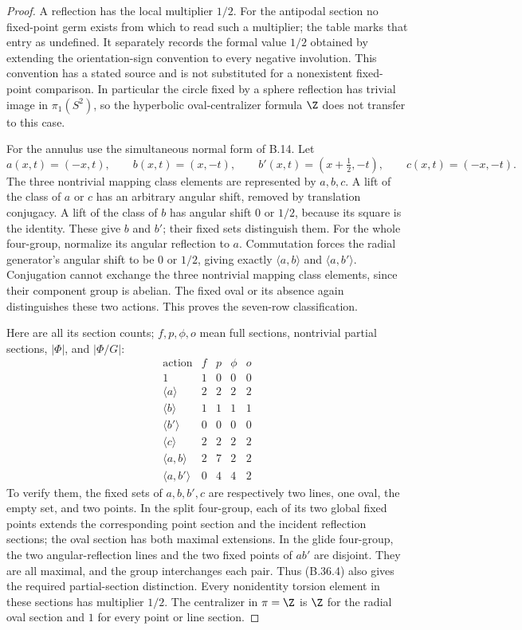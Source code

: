 \begin{proof}
A reflection has the local multiplier $1/2$.  For the antipodal
section no fixed-point germ exists from which to read such a
multiplier; the table marks that entry as undefined.  It separately
records the formal value $1/2$ obtained by extending the
orientation-sign convention to every negative involution.
This convention has a stated source and is not substituted for
a nonexistent fixed-point comparison.  In particular the
circle fixed by a sphere reflection has trivial image in
$\pi_1(S^2)$, so the hyperbolic oval-centralizer formula $\Z$
does not transfer to this case.

For the annulus use the simultaneous normal form of B.14.
Let
\[
 a(x,t)=(-x,t),\qquad
 b(x,t)=(x,-t),\qquad
 b'(x,t)=(x+\tfrac12,-t),\qquad
 c(x,t)=(-x,-t).                                      \tag{B.36.3}
\]
The three nontrivial mapping class elements are represented by
$a,b,c$.  A lift of the class of $a$ or $c$ has an arbitrary
angular shift, removed by translation conjugacy.
A lift of the class of $b$ has angular shift $0$ or $1/2$,
because its square is the identity.  These give $b$ and $b'$;
their fixed sets distinguish them.
For the whole four-group, normalize its angular reflection to
$a$.  Commutation forces the radial generator's angular shift
to be $0$ or $1/2$, giving exactly
$\langle a,b\rangle$ and $\langle a,b'\rangle$.
Conjugation cannot exchange the three nontrivial mapping class
elements, since their component group is abelian.  The fixed
oval or its absence again distinguishes these two actions.
This proves the seven-row classification.

Here are all its section counts; $f,p,\phi,o$ mean full sections,
nontrivial partial sections, $|\Phi|$, and $|\Phi/G|$:
\[
\begin{array}{l|rrrr}
\text{action}&f&p&\phi&o\\\hline
1&1&0&0&0\\
\langle a\rangle&2&2&2&2\\
\langle b\rangle&1&1&1&1\\
\langle b'\rangle&0&0&0&0\\
\langle c\rangle&2&2&2&2\\
\langle a,b\rangle&2&7&2&2\\
\langle a,b'\rangle&0&4&4&2
\end{array}                                             \tag{B.36.4}
\]
To verify them, the fixed sets of $a,b,b',c$ are respectively
two lines, one oval, the empty set, and two points.
In the split four-group, each of its two global fixed points
extends the corresponding point section and the incident
reflection sections; the oval section has both maximal extensions.
In the glide four-group, the two angular-reflection lines and the
two fixed points of $ab'$ are disjoint.  They are all maximal,
and the group interchanges each pair.  Thus (B.36.4) also gives
the required partial-section distinction.
Every nonidentity torsion element in these sections has multiplier
$1/2$.  The centralizer in $\pi=\Z$ is $\Z$ for the radial oval
section and $1$ for every point or line section.


\end{proof}
